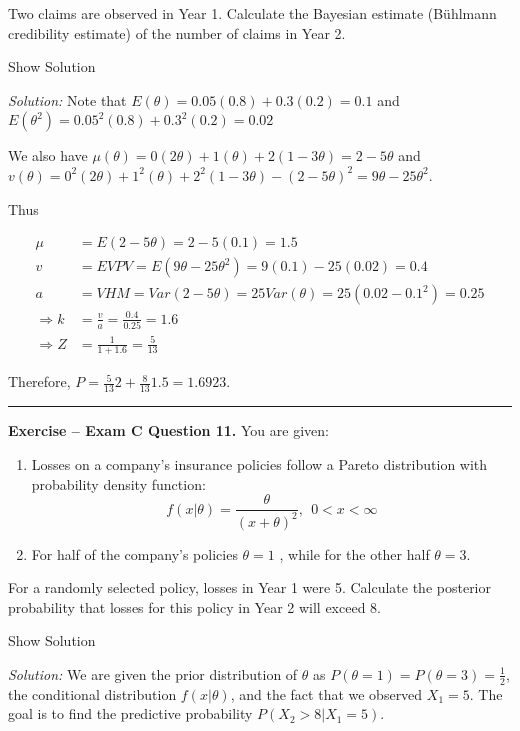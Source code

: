\documentclass[]{book}
\providecommand{\tightlist}{%
  \setlength{\itemsep}{0pt}\setlength{\parskip}{0pt}}
\theoremstyle{definition}
\theoremstyle{definition}
\theoremstyle{definition}
\theoremstyle{remark}
\begin{document}
Two claims are observed in Year 1. Calculate the Bayesian estimate
(Bühlmann credibility estimate) of the number of claims in Year 2.

Show Solution

\hypertarget{toggleExamC190}{}
\emph{Solution:} Note that \(E(\theta) = 0.05(0.8) + 0.3(0.2) = 0.1\)
and \(E(\theta^2) = 0.05^2(0.8) + 0.3^2(0.2)=0.02\)

We also have
\(\mu(\theta) = 0(2\theta) + 1(\theta) + 2(1-3\theta) = 2-5\theta\) and
\(v(\theta) = 0^2(2\theta) + 1^2(\theta) + 2^2(1-3\theta) - (2-5\theta)^2 = 9\theta-25\theta^2\).

Thus

\[\begin{aligned}
\mu &=  E(2-5\theta) = 2-5(0.1) = 1.5 \\
v   &=  EVPV = E(9\theta - 25\theta^2)=9(0.1)-25(0.02)=0.4 \\
a &= VHM = Var(2-5\theta) = 25Var(\theta) = 25(0.02-0.1^2) = 0.25 \\
\Rightarrow k &= \frac{v}{a} = \frac{0.4}{0.25} = 1.6 \\
\Rightarrow Z &= \frac{1}{1+1.6} = \frac{5}{13}
\end{aligned}\]

Therefore, \(P=\frac{5}{13}2 + \frac{8}{13}1.5 = 1.6923\).

\begin{center}\rule{0.5\linewidth}{\linethickness}\end{center}

\textbf{Exercise -- Exam C Question 11.} You are given:

\begin{enumerate}
\def\labelenumi{(\roman{enumi})}
\tightlist
\item
  Losses on a company's insurance policies follow a Pareto distribution
  with probability density function:
  \[f(x|\theta) = \frac{\theta}{(x+\theta)^2}, \ \ 0 < x < \infty\]
\item
  For half of the company's policies \(\theta=1\) , while for the other
  half \(\theta=3\).
\end{enumerate}

For a randomly selected policy, losses in Year 1 were 5. Calculate the
posterior probability that losses for this policy in Year 2 will exceed
8.

Show Solution

\hypertarget{toggleExamC11}{}
\emph{Solution:} We are given the prior distribution of \(\theta\) as
\(P(\theta=1)=P(\theta=3)=\frac{1}{2}\), the conditional distribution
\(f(x|\theta)\), and the fact that we observed \(X_1=5\). The goal is to
find the predictive probability \(P(X_2>8|X_1=5)\).
\end{document}

